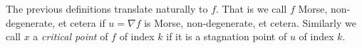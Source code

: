 The previous definitions translate naturally to $f$.
That is we call $f$ Morse, non-degenerate, et cetera if $u=\nabla f$ is Morse, non-degenerate, et cetera.
Similarly we call $x$ a \emph{critical point} of $f$ of index $k$ if it is a
stagnation point of $u$ of index $k$.

